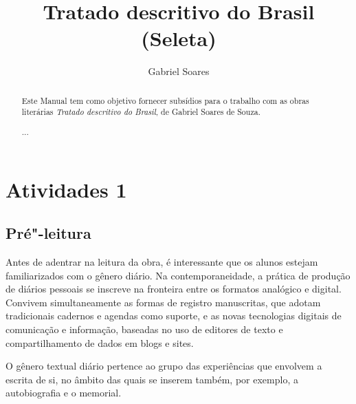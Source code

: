 \documentclass[12pt]{extarticle}
\begin{document}
\newcommand{\AutorLivro}{Gabriel Soares}
\newcommand{\TituloLivro}{Tratado descritivo do Brasil (Seleta)}
\newcommand{\Tema}{Diálogos com a sociologia e com a antropologia}
\newcommand{\Genero}{Diário, biografia, autobiografia, relatos, memórias}
\newcommand{\imagemCapa}{./images/PNLD0015-01.png}
\newcommand{\issnppub}{---}
\newcommand{\issnepub}{---}
\newcommand{\colaborador}{\textbf{Bruno Gradella e Vicente Castro} é uma pessoa incrível e vai fazer um bom serviço.}

{}
\title{\TituloLivro}
\author{\AutorLivro}
\def\authornotes{\colaborador}

\date{}
\maketitle

\begin{abstract}
Este Manual tem como objetivo fornecer subsídios para o trabalho com as
obras literárias \emph{Tratado descritivo do Brasil}, de Gabriel Soares
de Souza.

...
\end{abstract}

\tableofcontents

	
\section{Atividades 1}


\subsection{Pré"-leitura}


Antes de adentrar na leitura da obra, é interessante que os
alunos estejam familiarizados com o gênero diário. Na contemporaneidade,
a prática de produção de diários pessoais se inscreve na fronteira entre
os formatos analógico e digital. Convivem simultaneamente as formas de
registro manuscritas, que adotam tradicionais cadernos e agendas como
suporte, e as novas tecnologias digitais de comunicação e informação,
baseadas no uso de editores de texto e compartilhamento de dados em
blogs e sites.

O gênero textual diário pertence ao grupo das experiências que envolvem
a escrita de si, no âmbito das quais se inserem também, por exemplo, a
autobiografia e o memorial.
\end{document}
